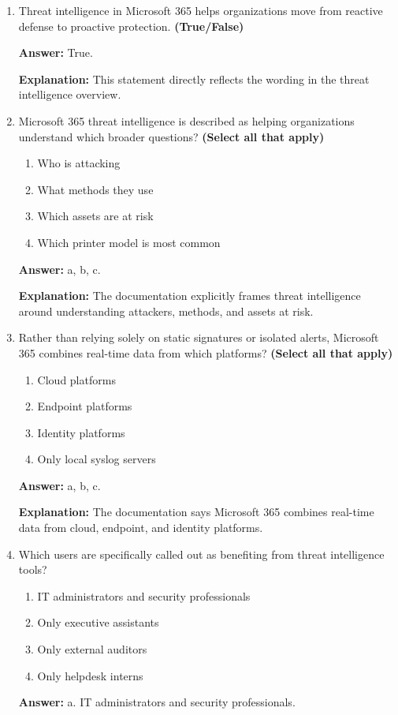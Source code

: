 \documentclass[10pt]{article}
\begin{document}
\begin{enumerate}[leftmargin=*]
\item Threat intelligence in Microsoft 365 helps organizations move from reactive defense to proactive protection. \textbf{(True/False)}

\textbf{Answer:} True.

\textbf{Explanation:} This statement directly reflects the wording in the threat intelligence overview.

\item Microsoft 365 threat intelligence is described as helping organizations understand which broader questions? \textbf{(Select all that apply)}
\begin{enumerate}[label=\alph*., leftmargin=1.5em]
\item Who is attacking
\item What methods they use
\item Which assets are at risk
\item Which printer model is most common
\end{enumerate}
\textbf{Answer:} a, b, c.

\textbf{Explanation:} The documentation explicitly frames threat intelligence around understanding attackers, methods, and assets at risk.

\item Rather than relying solely on static signatures or isolated alerts, Microsoft 365 combines real-time data from which platforms? \textbf{(Select all that apply)}
\begin{enumerate}[label=\alph*., leftmargin=1.5em]
\item Cloud platforms
\item Endpoint platforms
\item Identity platforms
\item Only local syslog servers
\end{enumerate}
\textbf{Answer:} a, b, c.

\textbf{Explanation:} The documentation says Microsoft 365 combines real-time data from cloud, endpoint, and identity platforms.

\item Which users are specifically called out as benefiting from threat intelligence tools?
\begin{enumerate}[label=\alph*., leftmargin=1.5em]
\item IT administrators and security professionals
\item Only executive assistants
\item Only external auditors
\item Only helpdesk interns
\end{enumerate}
\textbf{Answer:} a. IT administrators and security professionals.


\end{enumerate}
\end{document}
